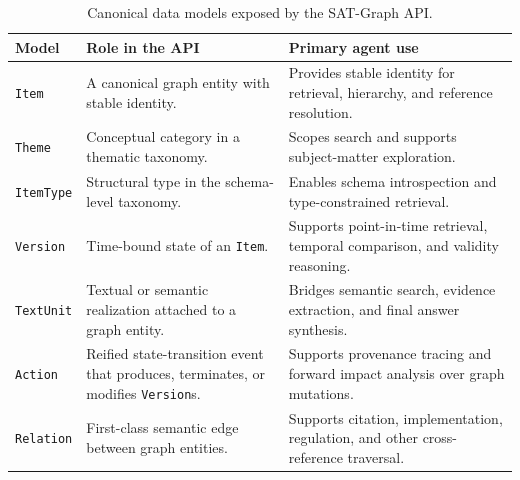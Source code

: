 \documentclass[11pt]{article}
\begin{document}
\begin{table}[htbp]
\centering
\caption{Canonical data models exposed by the SAT-Graph API.}
\label{tab:data_models_summary}
\begin{tabular}{p{} p{} p{}}
\toprule
\textbf{Model} & \textbf{Role in the API} & \textbf{Primary agent use} \\
\midrule
\texttt{Item} & A canonical graph entity with stable identity. & Provides stable identity for retrieval, hierarchy, and reference resolution. \\

\texttt{Theme} & Conceptual category in a thematic taxonomy. & Scopes search and supports subject-matter exploration. \\

\texttt{ItemType} & Structural type in the schema-level taxonomy. & Enables schema introspection and type-constrained retrieval. \\

\texttt{Version} & Time-bound state of an \texttt{Item}. & Supports point-in-time retrieval, temporal comparison, and validity reasoning. \\

\texttt{TextUnit} & Textual or semantic realization attached to a graph entity. & Bridges semantic search, evidence extraction, and final answer synthesis. \\

\texttt{Action} & Reified state-transition event that produces, terminates, or modifies \texttt{Version}s. & Supports provenance tracing and forward impact analysis over graph mutations. \\

\texttt{Relation} & First-class semantic edge between graph entities. & Supports citation, implementation, regulation, and other cross-reference traversal. \\
\bottomrule
\end{tabular}
\end{table}
\end{document}

